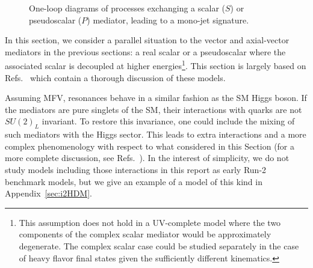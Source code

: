 \begin{figure}
\centering
{}\linewidth
\vspace{0.5\baselineskip}
	\caption
	{
		One-loop diagrams of processes exchanging a scalar ($S$) or pseudoscalar ($P$) mediator, leading to a mono-jet signature. 
	}
	\label{fig:feyn_prod_S}
\end{figure}

In this section, we consider a parallel situation to the vector and axial-vector mediators in the previous sections: a real scalar or a pseudoscalar where the associated scalar is decoupled at higher energies\footnote{This assumption does not hold in a UV-complete model where the two components of the complex scalar mediator would be approximately degenerate.  The complex scalar case could be studied separately in the case of heavy flavor final states given the sufficiently different kinematics.}. This section is largely based on Refs.~\cite{Buckley:2014fba,Harris:2014hga,Haisch:2015ioa} which contain a thorough discussion of these models. 

Assuming MFV, \spinzero resonances behave in a similar fashion as the SM Higgs boson. If the mediators are pure singlets of the SM, their interactions with quarks are not $SU(2)_L$ invariant. To restore this invariance, one could include the mixing of such mediators with the Higgs sector. This leads to extra interactions and a more complex phenomenology with respect to what considered in this Section (for a more complete discussion, see Refs.~\cite{Buckley:2014fba,Haisch:2015ioa}). In the interest of simplicity, we do not study models including those interactions in this report as early Run-2 benchmark models, but we give an example of a model of this kind in Appendix~\ref{sec:i2HDM}. 

